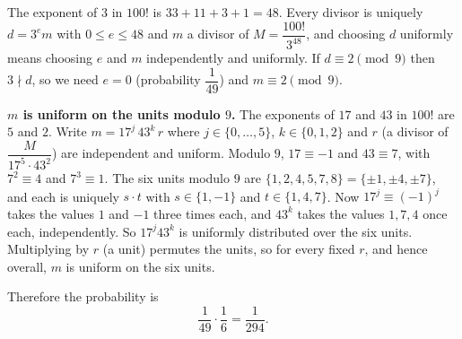 The exponent of $3$ in $100!$ is $33+11+3+1=48$. Every divisor is uniquely $d=3^e m$ with $0\le e\le48$ and $m$ a divisor of $M=\dfrac{100!}{3^{48}}$, and choosing $d$ uniformly means choosing $e$ and $m$ independently and uniformly. If $d\equiv2\pmod9$ then $3\nmid d$, so we need $e=0$ (probability $\dfrac{1}{49}$) and $m\equiv2\pmod9$.

\textbf{$m$ is uniform on the units modulo $9$.} The exponents of $17$ and $43$ in $100!$ are $5$ and $2$. Write $m=17^j\,43^k\,r$ where $j\in\{0,\dots,5\}$, $k\in\{0,1,2\}$ and $r$ (a divisor of $\dfrac{M}{17^5\cdot43^2}$) are independent and uniform. Modulo $9$, $17\equiv-1$ and $43\equiv7$, with $7^2\equiv4$ and $7^3\equiv1$. The six units modulo $9$ are $\{1,2,4,5,7,8\}=\{\pm1,\pm4,\pm7\}$, and each is uniquely $s\cdot t$ with $s\in\{1,-1\}$ and $t\in\{1,4,7\}$. Now $17^j\equiv(-1)^j$ takes the values $1$ and $-1$ three times each, and $43^k$ takes the values $1,7,4$ once each, independently. So $17^j43^k$ is uniformly distributed over the six units. Multiplying by $r$ (a unit) permutes the units, so for every fixed $r$, and hence overall, $m$ is uniform on the six units.

Therefore the probability is
\[
\dfrac{1}{49}\cdot\dfrac{1}{6}=\boxed{\dfrac{1}{294}}.
\]

